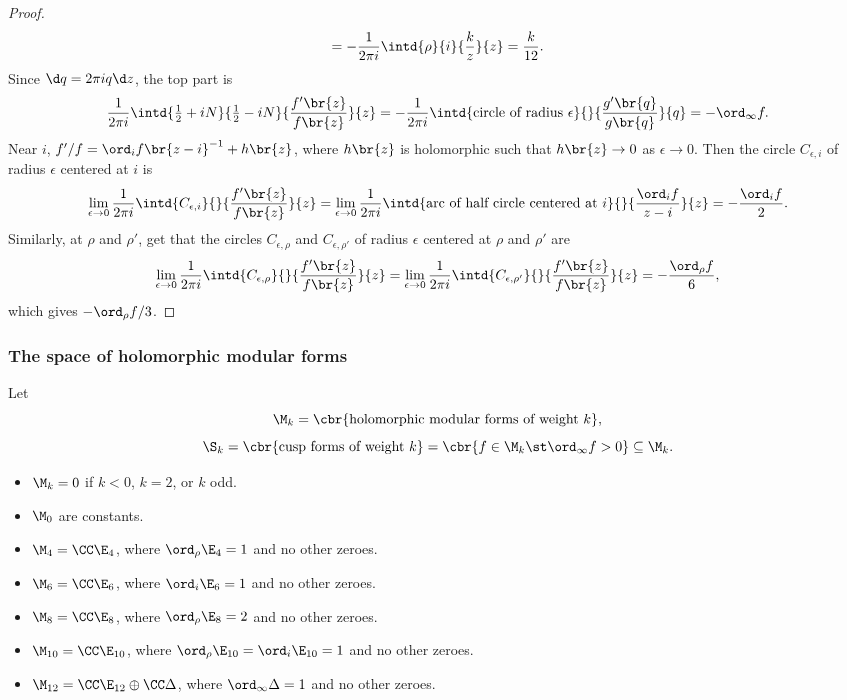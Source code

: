 \begin{proof}
\begin{align*}
= -\dfrac{1}{2\pi i}\intd{\rho}{i}{\dfrac{k}{z}}{z}
= \dfrac{k}{12}.
\end{align*}
Since $ \d q = 2\pi iq\d z $, the top part is
$$ \dfrac{1}{2\pi i}\intd{\tfrac{1}{2} + iN}{\tfrac{1}{2} - iN}{\dfrac{f'\br{z}}{f\br{z}}}{z} = -\dfrac{1}{2\pi i}\intd{\text{circle of radius} \ \epsilon}{}{\dfrac{g'\br{q}}{g\br{q}}}{q} = -\ord_\infty f. $$
Near $ i $, $ f' / f = \ord_i f\br{z - i}^{-1} + h\br{z} $, where $ h\br{z} $ is holomorphic such that $ h\br{z} \to 0 $ as $ \epsilon \to 0 $. Then the circle $ C_{\epsilon, i} $ of radius $ \epsilon $ centered at $ i $ is
$$ \lim_{\epsilon \to 0} \dfrac{1}{2\pi i}\intd{C_{\epsilon, i}}{}{\dfrac{f'\br{z}}{f\br{z}}}{z} = \lim_{\epsilon \to 0} \dfrac{1}{2\pi i}\intd{\text{arc of half circle centered at} \ i}{}{\dfrac{\ord_i f}{z - i}}{z} = -\dfrac{\ord_i f}{2}. $$
Similarly, at $ \rho $ and $ \rho' $, get that the circles $ C_{\epsilon, \rho} $ and $ C_{\epsilon, \rho'} $ of radius $ \epsilon $ centered at $ \rho $ and $ \rho' $ are
$$ \lim_{\epsilon \to 0} \dfrac{1}{2\pi i}\intd{C_{\epsilon, \rho}}{}{\dfrac{f'\br{z}}{f\br{z}}}{z} = \lim_{\epsilon \to 0} \dfrac{1}{2\pi i}\intd{C_{\epsilon, \rho'}}{}{\dfrac{f'\br{z}}{f\br{z}}}{z} = -\dfrac{\ord_\rho f}{6}, $$
which gives $ -\ord_\rho f / 3 $.
\end{proof}

\pagebreak

\subsubsection{The space of holomorphic modular forms}

Let
$$ \M_k = \cbr{\text{holomorphic modular forms of weight} \ k}, $$
$$ \S_k = \cbr{\text{cusp forms of weight} \ k} = \cbr{f \in \M_k \st \ord_\infty f > 0} \subseteq \M_k. $$

\begin{corollary}
\hfill
\begin{itemize}
\item $ \M_k = 0 $ if $ k < 0 $, $ k = 2 $, or $ k $ odd.
\item $ \M_0 $ are constants.
\item $ \M_4 = \CC\E_4 $, where $ \ord_\rho \E_4 = 1 $ and no other zeroes.
\item $ \M_6 = \CC\E_6 $, where $ \ord_i \E_6 = 1 $ and no other zeroes.
\item $ \M_8 = \CC\E_8 $, where $ \ord_\rho \E_8 = 2 $ and no other zeroes.
\item $ \M_{10} = \CC\E_{10} $, where $ \ord_\rho \E_{10} = \ord_i \E_{10} = 1 $ and no other zeroes.
\item $ \M_{12} = \CC\E_{12} \oplus \CC\Delta $, where $ \ord_\infty \Delta = 1 $ and no other zeroes.
\end{itemize}
\end{corollary}

